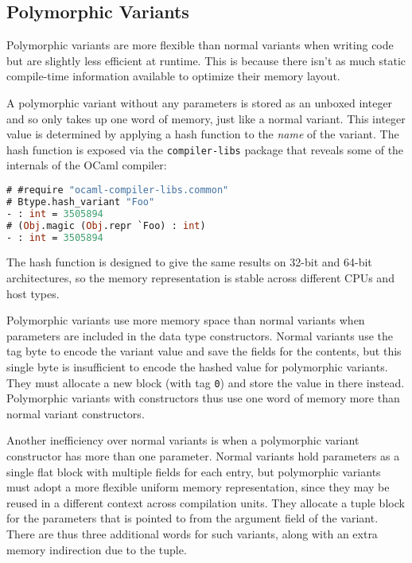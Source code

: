 \hypertarget{polymorphic-variants-1}{%
\subsection{Polymorphic Variants}\label{polymorphic-variants-1}}

Polymorphic variants are more flexible than normal variants when writing
code but are slightly less efficient at runtime. This is because there
isn't as much static compile-time information available to optimize
their memory layout.

A polymorphic variant without any parameters is stored as an unboxed
integer and so only takes up one word of memory, just like a normal
variant. This integer value is determined by applying a hash function to
the \emph{name} of the variant. The hash function is exposed via the
\passthrough{\lstinline!compiler-libs!} package that reveals some of the
internals of the OCaml compiler:

\begin{lstlisting}[language=Caml]
# #require "ocaml-compiler-libs.common"
# Btype.hash_variant "Foo"
- : int = 3505894
# (Obj.magic (Obj.repr `Foo) : int)
- : int = 3505894
\end{lstlisting}

The hash function is designed to give the same results on 32-bit and
64-bit architectures, so the memory representation is stable across
different CPUs and host types.

Polymorphic variants use more memory space than normal variants when
parameters are included in the data type constructors. Normal variants
use the tag byte to encode the variant value and save the fields for the
contents, but this single byte is insufficient to encode the hashed
value for polymorphic variants. They must allocate a new block (with tag
\passthrough{\lstinline!0!}) and store the value in there instead.
Polymorphic variants with constructors thus use one word of memory more
than normal variant constructors.

Another inefficiency over normal variants is when a polymorphic variant
constructor has more than one parameter. Normal variants hold parameters
as a single flat block with multiple fields for each entry, but
polymorphic variants must adopt a more flexible uniform memory
representation, since they may be reused in a different context across
compilation units. They allocate a tuple block for the parameters that
is pointed to from the argument field of the variant. There are thus
three additional words for such variants, along with an extra memory
indirection due to the tuple.

